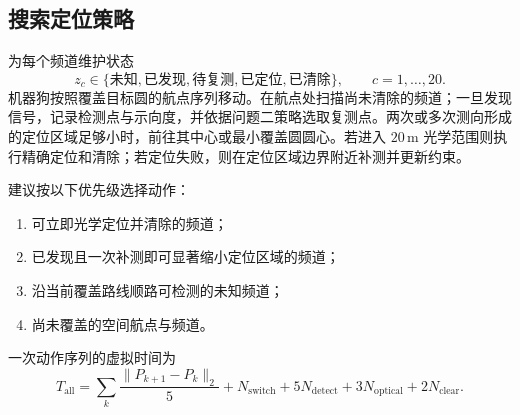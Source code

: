 \subsection{搜索定位策略}

为每个频道维护状态
\[
  z_c\in\{\text{未知},\text{已发现},\text{待复测},\text{已定位},\text{已清除}\},
  \qquad c=1,\ldots,20.
\]
机器狗按照覆盖目标圆的航点序列移动。在航点处扫描尚未清除的频道；一旦发现信号，记录检测点与示向度，并依据问题二策略选取复测点。两次或多次测向形成的定位区域足够小时，前往其中心或最小覆盖圆圆心。若进入 \(20\,\mathrm{m}\) 光学范围则执行精确定位和清除；若定位失败，则在定位区域边界附近补测并更新约束。

建议按以下优先级选择动作：
\begin{enumerate}
  \item 可立即光学定位并清除的频道；
  \item 已发现且一次补测即可显著缩小定位区域的频道；
  \item 沿当前覆盖路线顺路可检测的未知频道；
  \item 尚未覆盖的空间航点与频道。
\end{enumerate}

一次动作序列的虚拟时间为
\begin{equation}
  T_{\mathrm{all}}=
  \sum_k\frac{\|P_{k+1}-P_k\|_2}{5}
  +N_{\mathrm{switch}}+5N_{\mathrm{detect}}
  +3N_{\mathrm{optical}}+2N_{\mathrm{clear}}.
  \label{eq:time-p3}
\end{equation}
